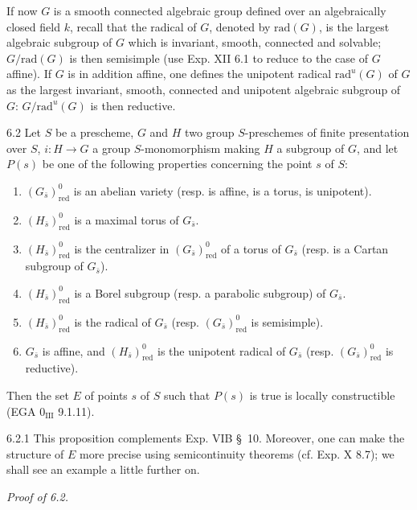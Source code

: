 If now $G$ is a smooth connected algebraic group defined over an algebraically closed field $k$, recall that the radical of $G$, denoted by $\mathrm{rad}(G)$, is the largest algebraic subgroup of $G$ which is invariant, smooth, connected and solvable; $G/\mathrm{rad}(G)$ is then semisimple (use Exp. XII 6.1 to reduce to the case of $G$ affine). If $G$ is in addition affine, one defines the unipotent radical $\mathrm{rad}^u(G)$ of $G$ as the largest invariant, smooth, connected and unipotent algebraic subgroup of $G$: $G/\mathrm{rad}^u(G)$ is then reductive.
\begin{proposition}{6.2}\label{XV.6.2}
Let $S$ be a prescheme, $G$ and $H$ two group $S$-preschemes of finite presentation over $S$, $i:H\to G$ a group $S$-monomorphism making $H$ a subgroup of $G$, and let $P(s)$ be one of the following properties concerning the point $s$ of $S$:
\begin{enumerate}[label=\textup{\roman*)}]
\item $(G_{\bar s})^0_{\mathrm{red}}$ is an abelian variety (resp. is affine, is a torus, is unipotent).
\item $(H_{\bar s})^0_{\mathrm{red}}$ is a maximal torus of $G_{\bar s}$.
\item $(H_{\bar s})^0_{\mathrm{red}}$ is the centralizer in $(G_{\bar s})^0_{\mathrm{red}}$ of a torus of $G_{\bar s}$ (resp. is a Cartan subgroup of $G_{\bar s}$).
\item $(H_{\bar s})^0_{\mathrm{red}}$ is a Borel subgroup (resp. a parabolic subgroup) of $G_{\bar s}$.
\item $(H_{\bar s})^0_{\mathrm{red}}$ is the radical of $G_{\bar s}$ (resp. $(G_{\bar s})^0_{\mathrm{red}}$ is semisimple).
\item $G_{\bar s}$ is affine, and $(H_{\bar s})^0_{\mathrm{red}}$ is the unipotent radical of $G_{\bar s}$ (resp. $(G_{\bar s})^0_{\mathrm{red}}$ is reductive).
\end{enumerate}
Then the set $E$ of points $s$ of $S$ such that $P(s)$ is true is locally constructible (EGA $0_{\mathrm{III}}$ 9.1.11).
\end{proposition}
\begin{remark}{6.2.1}\label{XV.6.2.1}
This proposition complements Exp. VIB \S~10. Moreover, one can make the structure of $E$ more precise using semicontinuity theorems (cf. Exp. X 8.7); we shall see an example a little further on.
\end{remark}
\par\noindent\emph{Proof of 6.2.}
